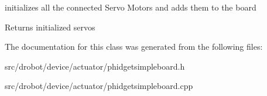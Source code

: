 initializes all the connected Servo Motors and adds them to the board 

\begin{DoxyReturn}{Returns}
initialized servos 
\end{DoxyReturn}


The documentation for this class was generated from the following files\-:\begin{DoxyCompactItemize}
\item 
src/drobot/device/actuator/phidgetsimpleboard.\-h\item 
src/drobot/device/actuator/phidgetsimpleboard.\-cpp\end{DoxyCompactItemize}
